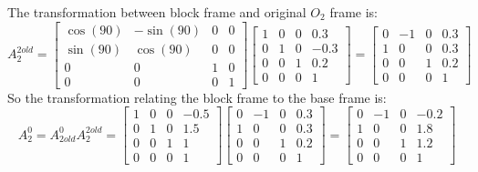 \documentclass[twoside,11pt]{homework}
\begin{document}
The transformation between block frame and original $O_2$ frame is:
%
\begin{equation}
A_2^{2old} = \left[
\begin{matrix}
\cos(90) & -\sin(90) & 0 & 0 \\
\sin(90) & \cos(90) & 0 & 0 \\
0 & 0 & 1 & 0 \\
0 & 0 & 0 & 1
\end{matrix}
\right]
\left[
\begin{matrix}
1 & 0 & 0 & 0.3 \\
0 & 1 & 0 & -0.3 \\
0 & 0 & 1 & 0.2 \\
0 & 0 & 0 & 1
\end{matrix}
\right]
 = 
 \left[
\begin{matrix}
0 & -1 & 0 & 0.3 \\
1 & 0 & 0 & 0.3 \\
0 & 0 & 1 & 0.2 \\
0 & 0 & 0 & 1
\end{matrix}
\right]
\end{equation}
%
So the transformation relating the block frame to the base frame is:
%
\begin{equation}
A_2^0 = A_{2old}^0 A_2^{2old} =  \begin{bmatrix}
1 & 0 & 0 & -0.5 \\
0 & 1 & 0 & 1.5 \\
0 & 0 & 1 & 1 \\
0 & 0 & 0 & 1 
\end{bmatrix} 
\left[
\begin{matrix}
0 & -1 & 0 & 0.3 \\
1 & 0 & 0 & 0.3 \\
0 & 0 & 1 & 0.2 \\
0 & 0 & 0 & 1
\end{matrix}
\right]
= \begin{bmatrix}
0 & -1 & 0 & -0.2 \\
1 & 0 & 0 & 1.8 \\
0 & 0 & 1 & 1.2 \\
0 & 0 & 0 & 1 
\end{bmatrix} 
\end{equation}
\end{document}
